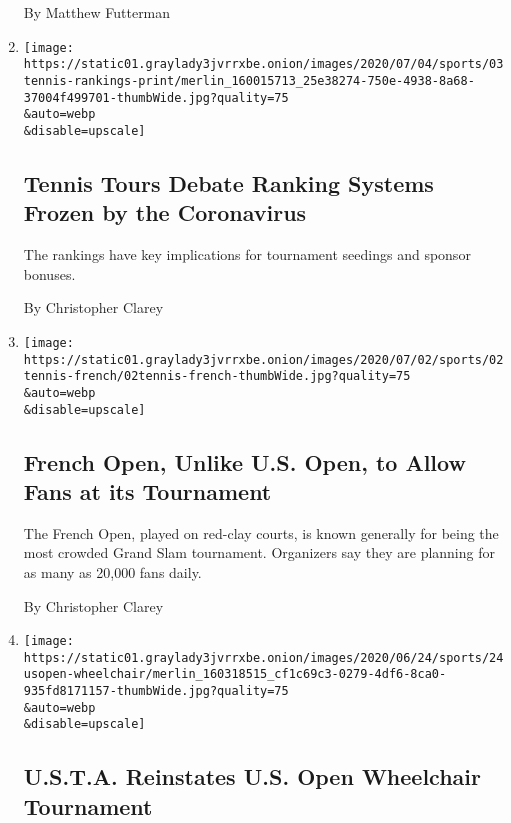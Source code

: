 \begin{enumerate}
  By Matthew Futterman
\item
  \href{/2020/07/04/sports/tennis/tennis-rankings-coronavirus.html}{}

  \texttt{[image: https://static01.graylady3jvrrxbe.onion/images/2020/07/04/sports/03tennis-rankings-print/merlin\_160015713\_25e38274-750e-4938-8a68-37004f499701-thumbWide.jpg?quality=75\\\&auto=webp\\\&disable=upscale]}

  \hypertarget{tennis-tours-debate-ranking-systems-frozen-by-the-coronavirus}{%
  \subsection{Tennis Tours Debate Ranking Systems Frozen by the
  Coronavirus}\label{tennis-tours-debate-ranking-systems-frozen-by-the-coronavirus}}

  The rankings have key implications for tournament seedings and sponsor
  bonuses.

  By Christopher Clarey
\item
  \href{/2020/07/02/sports/tennis/french-open-fans.html}{}

  \texttt{[image: https://static01.graylady3jvrrxbe.onion/images/2020/07/02/sports/02tennis-french/02tennis-french-thumbWide.jpg?quality=75\\\&auto=webp\\\&disable=upscale]}

  \hypertarget{french-open-unlike-us-open-to-allow-fans-at-its-tournament}{%
  \subsection{French Open, Unlike U.S. Open, to Allow Fans at its
  Tournament}\label{french-open-unlike-us-open-to-allow-fans-at-its-tournament}}

  The French Open, played on red-clay courts, is known generally for
  being the most crowded Grand Slam tournament. Organizers say they are
  planning for as many as 20,000 fans daily.

  By Christopher Clarey
\item
  \href{/2020/06/25/sports/tennis/us-open-wheelchair-tournament.html}{}

  \texttt{[image: https://static01.graylady3jvrrxbe.onion/images/2020/06/24/sports/24usopen-wheelchair/merlin\_160318515\_cf1c69c3-0279-4df6-8ca0-935fd8171157-thumbWide.jpg?quality=75\\\&auto=webp\\\&disable=upscale]}

  \hypertarget{usta-reinstates-us-open-wheelchair-tournament}{%
  \subsection{U.S.T.A. Reinstates U.S. Open Wheelchair
  Tournament}\label{usta-reinstates-us-open-wheelchair-tournament}}


\end{enumerate}
